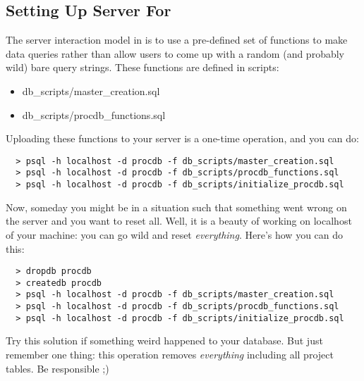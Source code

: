 \subsection{Setting Up {\psql} Server For {\pubs}}
The {\psql} server interaction model in {\pubs} is to use a pre-defined set of functions 
to make data queries rather than allow users to come up with a random (and probably wild)
bare query strings. These functions are defined in {\sql} scripts:
\begin{itemize}
  \item db\_scripts/master\_creation.sql
  \item db\_scripts/procdb\_functions.sql
\end{itemize}
Uploading these functions to your server is a one-time operation, and you can do:
\begin{lstlisting}
  > psql -h localhost -d procdb -f db_scripts/master_creation.sql
  > psql -h localhost -d procdb -f db_scripts/procdb_functions.sql
  > psql -h localhost -d procdb -f db_scripts/initialize_procdb.sql
\end{lstlisting}

Now, someday you might be in a situation such that something went wrong on the server
and you want to reset all. Well, it is a beauty of working on localhost of your machine:
you can go wild and reset {\it everything}. Here's how you can do this:
\begin{lstlisting}
  > dropdb procdb
  > createdb procdb
  > psql -h localhost -d procdb -f db_scripts/master_creation.sql
  > psql -h localhost -d procdb -f db_scripts/procdb_functions.sql
  > psql -h localhost -d procdb -f db_scripts/initialize_procdb.sql
\end{lstlisting}

Try this solution if something weird happened to your {\procdb} database.
But just remember one thing: this operation removes {\it everything} including 
all project tables. Be responsible ;)

